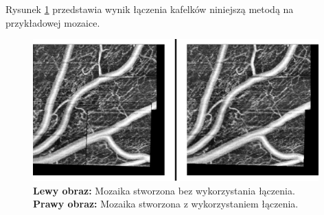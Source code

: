 Rysunek \ref{fig:proponowane_algorytmy:blend_eff} przedstawia wynik łączenia kafelków niniejszą metodą na przykładowej mozaice.

\begin{figure}[htb]
  \centering
  \includegraphics[width=11cm]{gfx/blend_eff}
  \caption{\textbf{Lewy obraz:} Mozaika stworzona bez wykorzystania łączenia. \textbf{Prawy obraz:} Mozaika stworzona z wykorzystaniem łączenia.}
  \label{fig:proponowane_algorytmy:blend_eff}
\end{figure}
